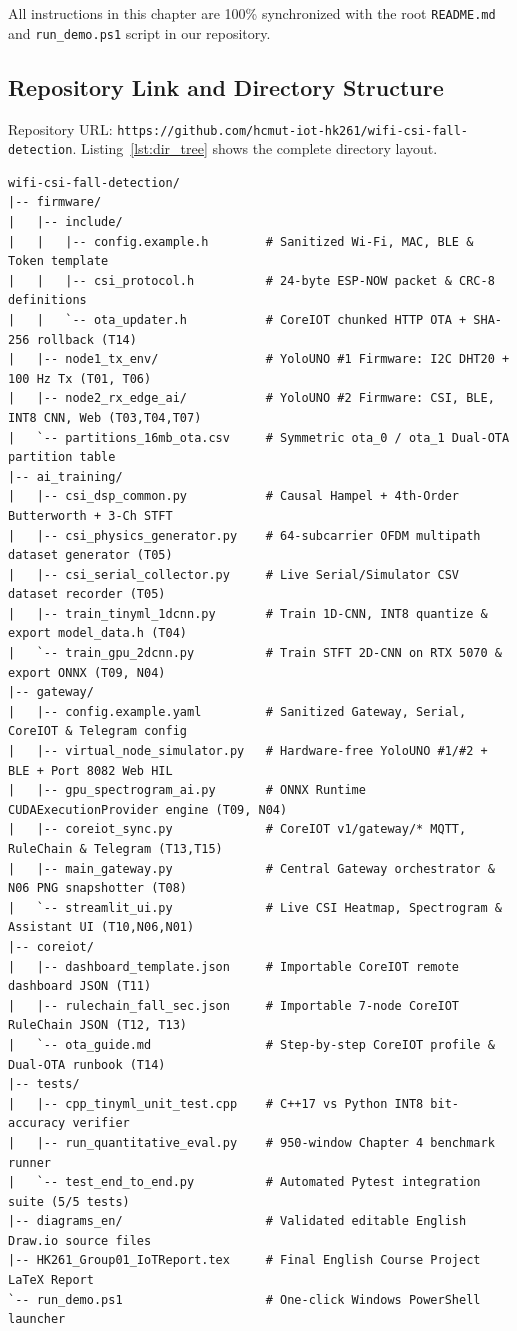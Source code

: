 \documentclass{hcmut-report}
\begin{document}
All instructions in this chapter are 100\% synchronized with the root \texttt{README.md} and \texttt{run\_demo.ps1} script in our repository.

\subsection[Repository and Directory Structure]{Repository Link and Directory Structure}
\label{sec:repo_tree}

Repository URL: \texttt{https://github.com/\allowbreak hcmut-iot-hk261/\allowbreak wifi-csi-fall-detection}. Listing~\ref{lst:dir_tree} shows the complete directory layout.

\begin{lstlisting}[caption={Project Directory Structure Synchronized with Root README.md},label={lst:dir_tree}]
wifi-csi-fall-detection/
|-- firmware/
|   |-- include/
|   |   |-- config.example.h        # Sanitized Wi-Fi, MAC, BLE & Token template
|   |   |-- csi_protocol.h          # 24-byte ESP-NOW packet & CRC-8 definitions
|   |   `-- ota_updater.h           # CoreIOT chunked HTTP OTA + SHA-256 rollback (T14)
|   |-- node1_tx_env/               # YoloUNO #1 Firmware: I2C DHT20 + 100 Hz Tx (T01, T06)
|   |-- node2_rx_edge_ai/           # YoloUNO #2 Firmware: CSI, BLE, INT8 CNN, Web (T03,T04,T07)
|   `-- partitions_16mb_ota.csv     # Symmetric ota_0 / ota_1 Dual-OTA partition table
|-- ai_training/
|   |-- csi_dsp_common.py           # Causal Hampel + 4th-Order Butterworth + 3-Ch STFT
|   |-- csi_physics_generator.py    # 64-subcarrier OFDM multipath dataset generator (T05)
|   |-- csi_serial_collector.py     # Live Serial/Simulator CSV dataset recorder (T05)
|   |-- train_tinyml_1dcnn.py       # Train 1D-CNN, INT8 quantize & export model_data.h (T04)
|   `-- train_gpu_2dcnn.py          # Train STFT 2D-CNN on RTX 5070 & export ONNX (T09, N04)
|-- gateway/
|   |-- config.example.yaml         # Sanitized Gateway, Serial, CoreIOT & Telegram config
|   |-- virtual_node_simulator.py   # Hardware-free YoloUNO #1/#2 + BLE + Port 8082 Web HIL
|   |-- gpu_spectrogram_ai.py       # ONNX Runtime CUDAExecutionProvider engine (T09, N04)
|   |-- coreiot_sync.py             # CoreIOT v1/gateway/* MQTT, RuleChain & Telegram (T13,T15)
|   |-- main_gateway.py             # Central Gateway orchestrator & N06 PNG snapshotter (T08)
|   `-- streamlit_ui.py             # Live CSI Heatmap, Spectrogram & Assistant UI (T10,N06,N01)
|-- coreiot/
|   |-- dashboard_template.json     # Importable CoreIOT remote dashboard JSON (T11)
|   |-- rulechain_fall_sec.json     # Importable 7-node CoreIOT RuleChain JSON (T12, T13)
|   `-- ota_guide.md                # Step-by-step CoreIOT profile & Dual-OTA runbook (T14)
|-- tests/
|   |-- cpp_tinyml_unit_test.cpp    # C++17 vs Python INT8 bit-accuracy verifier
|   |-- run_quantitative_eval.py    # 950-window Chapter 4 benchmark runner
|   `-- test_end_to_end.py          # Automated Pytest integration suite (5/5 tests)
|-- diagrams_en/                    # Validated editable English Draw.io source files
|-- HK261_Group01_IoTReport.tex     # Final English Course Project LaTeX Report
`-- run_demo.ps1                    # One-click Windows PowerShell launcher
\end{lstlisting}
\end{document}

